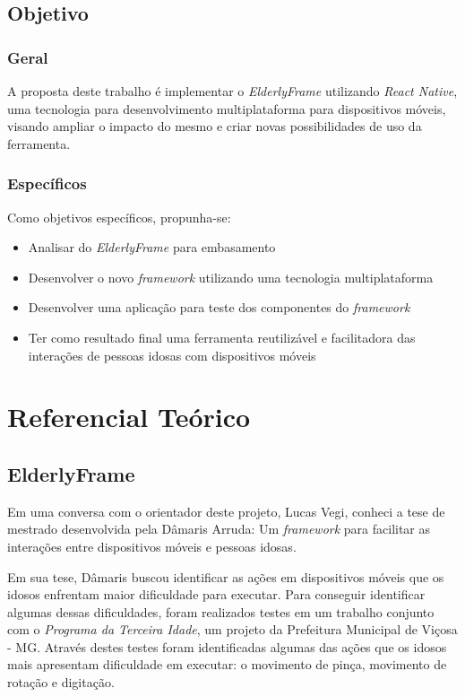 \documentclass[
	12pt,				    %
	openright,			    %
	oneside,			    %
	a4paper,			    %
    sumario=tradicional,    %
	english,			    %
	brazil,				    %
	]{abntex2}              %
\begin{document}
\section{Objetivo}\label{sec:objetivos}

\subsection{Geral}

A proposta deste trabalho é implementar o \emph{ElderlyFrame} utilizando \emph{React Native}, uma tecnologia para desenvolvimento multiplataforma para dispositivos móveis, visando ampliar o impacto do mesmo e criar novas possibilidades de uso da ferramenta.

\subsection{Específicos}

Como objetivos específicos, propunha-se:

\begin{itemize}
	\item Analisar do \textit{ElderlyFrame} para embasamento
	\item Desenvolver o novo \textit{framework} utilizando uma tecnologia multiplataforma
	\item Desenvolver uma aplicação para teste dos componentes do \textit{framework}
	\item Ter como resultado final uma ferramenta reutilizável e facilitadora das interações de pessoas idosas com dispositivos móveis
\end{itemize}

\chapter{Referencial Teórico}\label{sec:referencialTeorico}

\section{ElderlyFrame}

Em uma conversa com o orientador deste projeto, Lucas Vegi, conheci a tese de mestrado desenvolvida pela Dâmaris Arruda: Um \textit{framework} para facilitar as interações entre dispositivos móveis e pessoas idosas\cite{tesedamaris}.

\par

Em sua tese, Dâmaris buscou identificar as ações em dispositivos móveis que os idosos enfrentam maior dificuldade para executar. Para conseguir identificar algumas dessas dificuldades, foram realizados testes em um trabalho conjunto com o \emph{Programa da Terceira Idade}, um projeto da Prefeitura Municipal de Viçosa - MG. Através destes testes foram identificadas algumas das ações que os idosos mais apresentam dificuldade em executar: o movimento de pinça, movimento de rotação e digitação.
\end{document}
